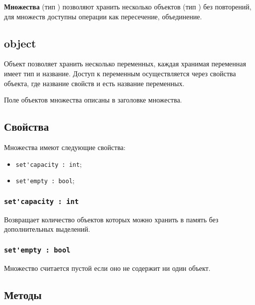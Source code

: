 \documentclass[a4paper, 14pt]{extarticle}
\newenvironment{icItems}
	{ \begin{itemize} [noitemsep,nolistsep] }
	{ \end{itemize} }
\begin{document}
{\bf Множества} (тип \set) позволяют хранить несколько объектов (тип \object) без повторений, для множеств доступны операции как пересечение, объединение.

\subsection{{\color{bluemarin} object}}

Объект позволяет хранить несколько переменных, каждая хранимая переменная имеет тип и название. Доступ к переменным осуществляется через свойства объекта, где название свойств и есть название переменных.

Поле объектов множества описаны в заголовке множества.

\subsection{Свойства}

Множества имеют следующие свойства:
\begin{icItems}
\item \lstinline|set'capacity : int|;
\item \lstinline|set'empty : bool|;
\end{icItems}

\subsubsection{\lstinline|set'capacity : int|}

Возвращает количество объектов которых можно хранить в память без дополнительных выделений.

\subsubsection{\lstinline|set'empty : bool|}

Множество считается пустой если оно не содержит ни один объект.

\subsection{Методы}
\end{document}
